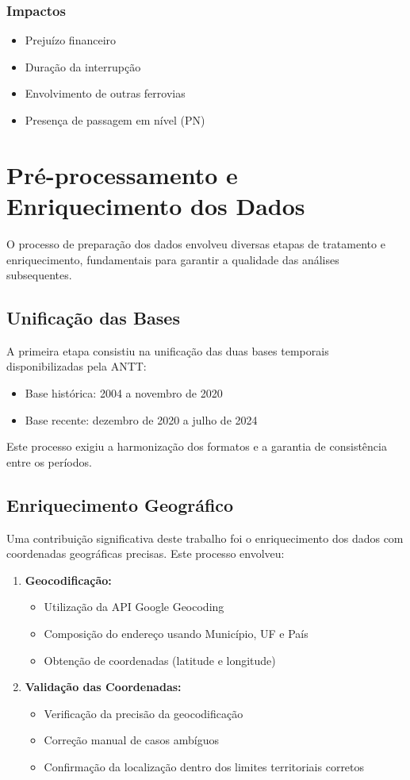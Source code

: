 \documentclass[conference]{IEEEtran}
\begin{document}
\subsubsection{Impactos}
\begin{itemize}
\item Prejuízo financeiro
\item Duração da interrupção
\item Envolvimento de outras ferrovias
\item Presença de passagem em nível (PN)
\end{itemize}

\section{Pré-processamento e Enriquecimento dos Dados}
O processo de preparação dos dados envolveu diversas etapas de tratamento e enriquecimento, fundamentais para garantir a qualidade das análises subsequentes.

\subsection{Unificação das Bases}
A primeira etapa consistiu na unificação das duas bases temporais disponibilizadas pela ANTT:
\begin{itemize}
\item Base histórica: 2004 a novembro de 2020
\item Base recente: dezembro de 2020 a julho de 2024
\end{itemize}

Este processo exigiu a harmonização dos formatos e a garantia de consistência entre os períodos.

\subsection{Enriquecimento Geográfico}
Uma contribuição significativa deste trabalho foi o enriquecimento dos dados com coordenadas geográficas precisas. Este processo envolveu:

\begin{enumerate}
\item \textbf{Geocodificação:}
   \begin{itemize}
   \item Utilização da API Google Geocoding
   \item Composição do endereço usando Município, UF e País
   \item Obtenção de coordenadas (latitude e longitude)
   \end{itemize}

\item \textbf{Validação das Coordenadas:}
   \begin{itemize}
   \item Verificação da precisão da geocodificação
   \item Correção manual de casos ambíguos
   \item Confirmação da localização dentro dos limites territoriais corretos
   \end{itemize}
\end{enumerate}
\end{document}
